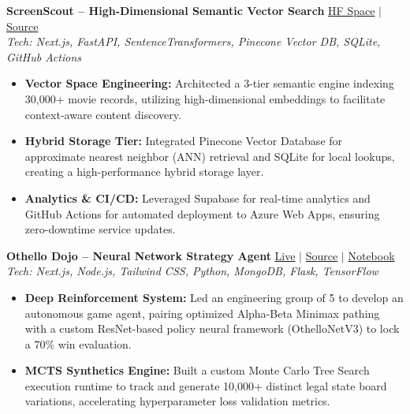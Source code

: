 \documentclass[10pt, a4paper]{article}
\begin{document}
\vspace{0.4ex}
\noindent
\textbf{ScreenScout -- High-Dimensional Semantic Vector Search} \hfill \href{https://huggingface.co/spaces/Agrannya/CinemaAI}{\faLink{} HF Space} $|$ \href{https://github.com/Agrannya-Singh/Semantic-Recommendation-Service}{\faGithub{} Source} \\
\textit{Tech: Next.js, FastAPI, SentenceTransformers, Pinecone Vector DB, SQLite, GitHub Actions}
\begin{itemize}
    \item \textbf{Vector Space Engineering:} Architected a 3-tier semantic engine indexing 30,000+ movie records, utilizing high-dimensional embeddings to facilitate context-aware content discovery.
    \item \textbf{Hybrid Storage Tier:} Integrated Pinecone Vector Database for approximate nearest neighbor (ANN) retrieval and SQLite for local lookups, creating a high-performance hybrid storage layer.
    \item \textbf{Analytics \& CI/CD:} Leveraged Supabase for real-time analytics and GitHub Actions for automated deployment to Azure Web Apps, ensuring zero-downtime service updates.
\end{itemize}

\vspace{0.4ex}
\noindent
\textbf{Othello Dojo -- Neural Network Strategy Agent} \hfill \href{https://othello-dojo.vercel.app/}{\faLink{} Live} $|$ \href{https://github.com/Agrannya-Singh/Othello-Dojo}{\faGithub{} Source} $|$ \href{https://www.kaggle.com/code/agrannyasingh/othello-v3/notebook}{\faKaggle{} Notebook} \\
\textit{Tech: Next.js, Node.js, Tailwind CSS, Python, MongoDB, Flask, TensorFlow}
\begin{itemize}
    \item \textbf{Deep Reinforcement System:} Led an engineering group of 5 to develop an autonomous game agent, pairing optimized Alpha-Beta Minimax pathing with a custom ResNet-based policy neural framework (OthelloNetV3) to lock a 70\% win evaluation.
    \item \textbf{MCTS Synthetics Engine:} Built a custom Monte Carlo Tree Search execution runtime to track and generate 10,000+ distinct legal state board variations, accelerating hyperparameter loss validation metrics.
\end{itemize}

\end{document}
